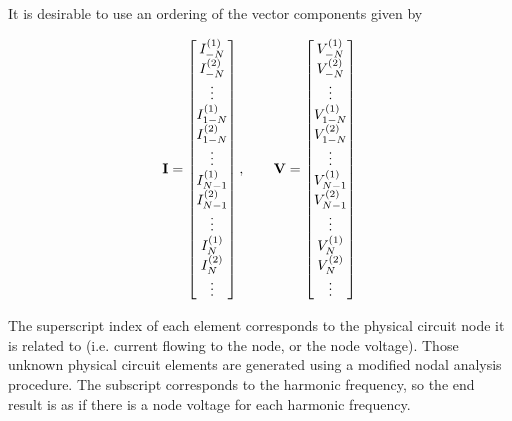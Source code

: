 \documentclass[12pt,journal,compsoc]{../ieeepaper/IEEEtran}
\begin{document}
It is desirable to use an ordering of the vector components given by

\begin{equation}\label{eqn:ece1254projectReport:580}
\BI = 
\begin{bmatrix}
I^{(1)}_{-N} \\
I^{(2)}_{-N} \\
\vdots \\
I^{(1)}_{1-N} \\
I^{(2)}_{1-N} \\
\vdots \\
I^{(1)}_{N-1} \\
I^{(2)}_{N-1} \\
\vdots \\
I^{(1)}_{N} \\
I^{(2)}_{N} \\
\vdots \\
\end{bmatrix},
\qquad \BV = 
\begin{bmatrix}
V^{(1)}_{-N} \\
V^{(2)}_{-N} \\
\vdots \\
V^{(1)}_{1-N} \\
V^{(2)}_{1-N} \\
\vdots \\
V^{(1)}_{N-1} \\
V^{(2)}_{N-1} \\
\vdots \\
V^{(1)}_{N} \\
V^{(2)}_{N} \\
\vdots \\
\end{bmatrix}
\end{equation}

The superscript index of each element corresponds to the physical circuit node it is related to (i.e.
current flowing to the node, or the node voltage).  
Those unknown physical circuit elements are generated using a modified nodal analysis procedure.
The subscript corresponds to the harmonic frequency, so the end result is as if there is a 
node voltage for each harmonic frequency.
\end{document}
